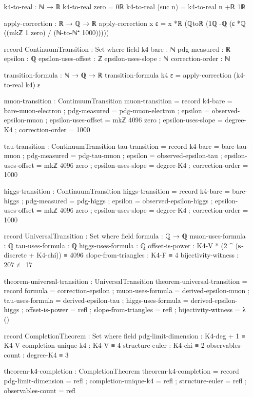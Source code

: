 \documentclass[11pt,a4paper]{book}
\begin{document}
\begin{code}
k4-to-real : ℕ → ℝ
k4-to-real zero = 0ℝ
k4-to-real (suc n) = k4-to-real n +ℝ 1ℝ

apply-correction : ℝ → ℚ → ℝ
apply-correction x ε = x *ℝ (ℚtoℝ (1ℚ -ℚ (ε *ℚ ((mkℤ 1 zero) / (ℕ-to-ℕ⁺ 1000)))))

record ContinuumTransition : Set where
  field
    k4-bare : ℕ
    pdg-measured : ℝ
    epsilon : ℚ
    epsilon-uses-offset : ℤ
    epsilon-uses-slope : ℕ
    correction-order : ℕ

transition-formula : ℕ → ℚ → ℝ
transition-formula k4 ε = apply-correction (k4-to-real k4) ε
\end{code}

\begin{code}
muon-transition : ContinuumTransition
muon-transition = record
  { k4-bare = bare-muon-electron
  ; pdg-measured = pdg-muon-electron
  ; epsilon = observed-epsilon-muon
  ; epsilon-uses-offset = mkℤ 4096 zero
  ; epsilon-uses-slope = degree-K4
  ; correction-order = 1000
  }

tau-transition : ContinuumTransition
tau-transition = record
  { k4-bare = bare-tau-muon
  ; pdg-measured = pdg-tau-muon
  ; epsilon = observed-epsilon-tau
  ; epsilon-uses-offset = mkℤ 4096 zero
  ; epsilon-uses-slope = degree-K4
  ; correction-order = 1000
  }

higgs-transition : ContinuumTransition
higgs-transition = record
  { k4-bare = bare-higgs
  ; pdg-measured = pdg-higgs
  ; epsilon = observed-epsilon-higgs
  ; epsilon-uses-offset = mkℤ 4096 zero
  ; epsilon-uses-slope = degree-K4
  ; correction-order = 1000
  }
\end{code}

\begin{code}
record UniversalTransition : Set where
  field
    formula : ℚ → ℚ
    muon-uses-formula : ℚ
    tau-uses-formula : ℚ
    higgs-uses-formula : ℚ
    offset-is-power : K4-V * (2 ^ (κ-discrete + K4-chi)) ≡ 4096
    slope-from-triangles : K4-F ≡ 4
    bijectivity-witness : 207 ≢ 17

theorem-universal-transition : UniversalTransition
theorem-universal-transition = record
  { formula = correction-epsilon
  ; muon-uses-formula = derived-epsilon-muon
  ; tau-uses-formula = derived-epsilon-tau
  ; higgs-uses-formula = derived-epsilon-higgs
  ; offset-is-power = refl
  ; slope-from-triangles = refl
  ; bijectivity-witness = λ ()
  }
\end{code}

\begin{code}
record CompletionTheorem : Set where
  field
    pdg-limit-dimension : K4-deg + 1 ≡ K4-V
    completion-unique-k4 : K4-V ≡ 4
    structure-euler : K4-chi ≡ 2
    observables-count : degree-K4 ≡ 3

theorem-k4-completion : CompletionTheorem
theorem-k4-completion = record
  { pdg-limit-dimension = refl
  ; completion-unique-k4 = refl
  ; structure-euler = refl
  ; observables-count = refl
  }
\end{code}
\end{document}
